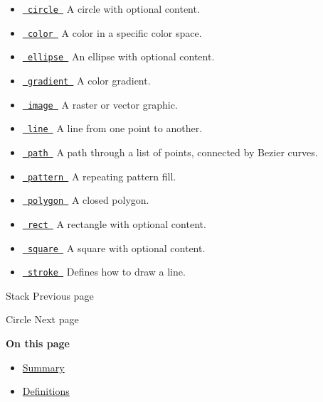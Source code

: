 \begin{itemize}
\tightlist
\item
  \href{/docs/reference/visualize/circle/}{\texttt{\ circle\ }} { A
  circle with optional content. }
\item
  \href{/docs/reference/visualize/color/}{\texttt{\ color\ }} { A color
  in a specific color space. }
\item
  \href{/docs/reference/visualize/ellipse/}{\texttt{\ ellipse\ }} { An
  ellipse with optional content. }
\item
  \href{/docs/reference/visualize/gradient/}{\texttt{\ gradient\ }} { A
  color gradient. }
\item
  \href{/docs/reference/visualize/image/}{\texttt{\ image\ }} { A raster
  or vector graphic. }
\item
  \href{/docs/reference/visualize/line/}{\texttt{\ line\ }} { A line
  from one point to another. }
\item
  \href{/docs/reference/visualize/path/}{\texttt{\ path\ }} { A path
  through a list of points, connected by Bezier curves. }
\item
  \href{/docs/reference/visualize/pattern/}{\texttt{\ pattern\ }} { A
  repeating pattern fill. }
\item
  \href{/docs/reference/visualize/polygon/}{\texttt{\ polygon\ }} { A
  closed polygon. }
\item
  \href{/docs/reference/visualize/rect/}{\texttt{\ rect\ }} { A
  rectangle with optional content. }
\item
  \href{/docs/reference/visualize/square/}{\texttt{\ square\ }} { A
  square with optional content. }
\item
  \href{/docs/reference/visualize/stroke/}{\texttt{\ stroke\ }} {
  Defines how to draw a line. }
\end{itemize}

\href{/docs/reference/layout/stack/}{\pandocbounded{}}

{ Stack } { Previous page }

\href{/docs/reference/visualize/circle/}{\pandocbounded{}}

{ Circle } { Next page }

\textbf{On this page}

\begin{itemize}
\tightlist
\item
  \hyperref[summary]{Summary}
\item
  \hyperref[definitions]{Definitions}
\end{itemize}

